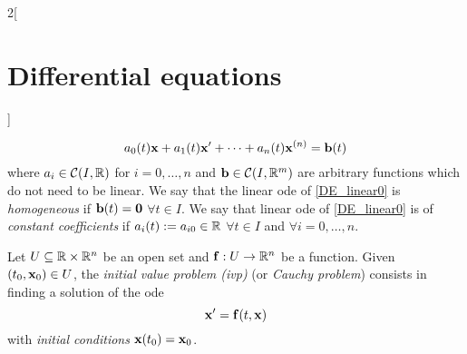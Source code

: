 \documentclass[../../../main.tex]{subfiles}
\begin{document}
\begin{multicols}{2}[\section{Differential equations}]
\begin{definition}
    \begin{equation}\label{DE_linear0}
      a_0(t)\boldsymbol{\mathrm{x}}+a_1(t)\boldsymbol{\mathrm{x}}'+\cdots+a_n(t)\boldsymbol{\mathrm{x}}^{(n)}=\boldsymbol{\mathrm{b}}(t)
    \end{equation}
    where $a_i\in\mathcal{C}(I,\mathbb{R})$ for $i=0,\ldots,n$ and $\boldsymbol{\mathrm{b}}\in\mathcal{C}(I,\mathbb{R}^m)$ are arbitrary functions which do not need to be linear. We say that the linear ode of \cref{DE_linear0} is \textit{homogeneous} if $\boldsymbol{\mathrm{b}}(t)=\boldsymbol{\mathrm{0}}$ $\forall t\in I$. We say that linear ode of \cref{DE_linear0} is of \textit{constant coefficients} if $a_i(t):=a_{i0}\in\mathbb{R}$ $\forall t\in I$ and $\forall i=0,\ldots,n$.
  \end{definition}
  \begin{definition}
    Let $U\subseteq\mathbb{R}\times\mathbb{R}^n$ be an open set and $\boldsymbol{\mathrm{f}}:U\rightarrow\mathbb{R}^n$ be a function. Given $(t_0,\boldsymbol{\mathrm{x}}_0)\in U$, the \textit{initial value problem (ivp)} (or \textit{Cauchy problem}) consists in finding a solution of the ode $$\boldsymbol{\mathrm{x}}'=\boldsymbol{\mathrm{f}}(t,\boldsymbol{\mathrm{x}})$$ with \textit{initial conditions} $\boldsymbol{\mathrm{x}}(t_0)=\boldsymbol{\mathrm{x}}_0$.
  \end{definition}

\end{multicols}
\end{document}
